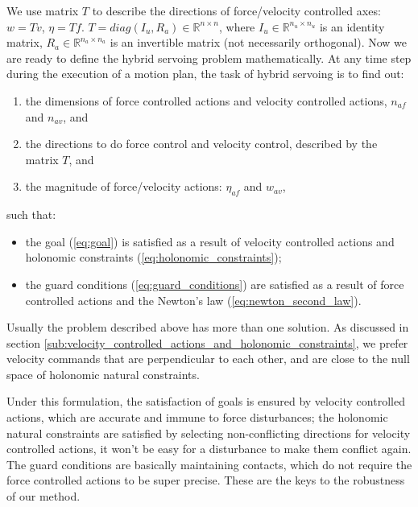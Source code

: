 We use matrix $T$ to describe the directions of force/velocity controlled axes: $w=Tv$, $\eta=Tf$.
$T=diag(I_u, R_a)\in \mathbb{R}^{n\times n}$, where $I_u\in \mathbb{R}^{n_u\times n_u}$ is an identity matrix, $R_a\in \mathbb{R}^{n_a\times n_a}$ is an invertible matrix (not necessarily orthogonal).
%
Now we are ready to define the hybrid servoing problem mathematically. At any time step during the execution of a motion plan, the task of hybrid servoing is to find out:
\begin{enumerate}
	\item the dimensions of force controlled actions and velocity controlled actions, $n_{af}$ and $n_{av}$, and
	\item the directions to do force control and velocity control, described by the matrix $T$, and
	\item the magnitude of force/velocity actions: $\eta_{af}$ and $w_{av}$,
\end{enumerate}
such that:
\begin{itemize}
	\item the goal (\ref{eq:goal}) is satisfied as a result of velocity controlled actions and holonomic constraints (\ref{eq:holonomic_constraints});
	\item the guard conditions (\ref{eq:guard_conditions}) are satisfied as a result of force controlled actions and the Newton's law (\ref{eq:newton_second_law}).
\end{itemize}
% 
Usually the problem described above has more than one solution. As discussed in section \ref{sub:velocity_controlled_actions_and_holonomic_constraints}, we prefer velocity commands that are perpendicular to each other, and are close to the null space of holonomic natural constraints.

Under this formulation, the satisfaction of goals is ensured by velocity controlled actions, which are accurate and immune to force disturbances; the holonomic natural constraints are satisfied by selecting non-conflicting directions for velocity controlled actions, it won't be easy for a disturbance to make them conflict again. The guard conditions are basically maintaining contacts, which do not require the force controlled actions to be super precise. These are the keys to the robustness of our method.



